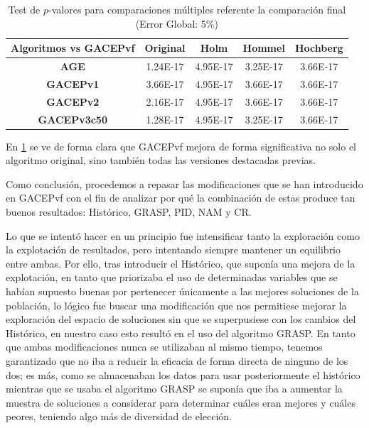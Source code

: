 \begin{table}[h]
\begin{tabular}{|c|c|c|c|c|}
\hline
\multicolumn{1}{|l|}{Algoritmos vs  GACEPvf} & \textbf{Original} & \textbf{Holm}                   & \textbf{Hommel}                 & \textbf{Hochberg}               \\ \hline
\textbf{AGE}                                & 1.24E-17          & {\color[HTML]{0000FF} 4.95E-17} & {\color[HTML]{0000FF} 3.25E-17} & {\color[HTML]{0000FF} 3.66E-17} \\ \hline
\textbf{GACEPv1}                             & 3.66E-17          & {\color[HTML]{0000FF} 4.95E-17} & {\color[HTML]{0000FF} 3.66E-17} & {\color[HTML]{0000FF} 3.66E-17} \\ \hline
\textbf{GACEPv2}                             & 2.16E-17          & {\color[HTML]{0000FF} 4.95E-17} & {\color[HTML]{0000FF} 3.66E-17} & {\color[HTML]{0000FF} 3.66E-17} \\ \hline
\textbf{GACEPv3c50}                          & 1.28E-17          & {\color[HTML]{0000FF} 4.95E-17} & {\color[HTML]{0000FF} 3.25E-17} & {\color[HTML]{0000FF} 3.66E-17} \\ \hline
\end{tabular}
\caption{\label{TestFinal}Test de $p$-valores para comparaciones múltiples referente la comparación final (Error Global: 5\%)}
\end{table}

En \ref{TestFinal} se ve de forma clara que GACEPvf mejora de forma significativa no solo el algoritmo original, sino también todas las versiones destacadas previas. 

Como conclusión, procedemos a repasar las modificaciones que se han introducido en GACEPvf con el fin de analizar por qué la combinación de estas produce tan buenos resultados: Histórico, GRASP, PID, NAM y CR. 

Lo que se intentó hacer en un principio fue intensificar tanto la exploración como la explotación de resultados, pero intentando siempre mantener un equilibrio entre ambas. 
Por ello, tras introducir el Histórico, que suponía una mejora de la explotación, en tanto que priorizaba el uso de determinadas variables que se habían supuesto buenas por pertenecer únicamente a las mejores soluciones de la población, lo lógico fue buscar una modificación que nos permitiese mejorar la exploración del espacio de soluciones sin que se superpusiese con los cambios del Histórico, en nuestro caso esto resultó en el uso del algoritmo GRASP. 
En tanto que ambas modificaciones nunca se utilizaban al mismo tiempo, tenemos garantizado que no iba a reducir la eficacia de forma directa de ninguno de los dos; es más, como se almacenaban los datos para usar posteriormente el histórico mientras que se usaba el algoritmo GRASP se suponía que iba a aumentar la muestra de soluciones a considerar para determinar cuáles eran mejores y cuáles peores, teniendo algo más de diversidad de elección. 

